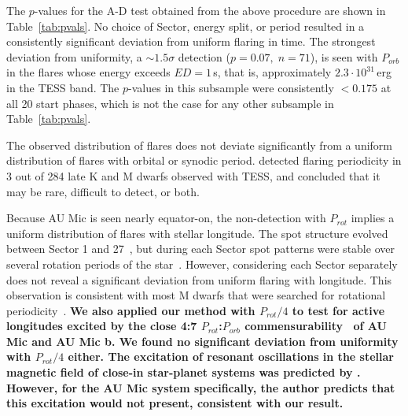 \documentclass[fleqn,usenatbib]{mnras}%
\begin{document}
The $p$-values for the A-D test obtained from the above procedure are shown in Table~\ref{tab:pvals}. No choice of Sector, energy split, or period resulted in a consistently significant deviation from uniform flaring in time. The strongest deviation from uniformity, a $\sim1.5\sigma$ detection ($p=0.07,\;n=71$), is seen with $P_{orb}$ in the flares whose energy exceeds $ED=1$\,s, that is, approximately $2.3\cdot10^{31}\,$erg in the TESS band. The $p$-values in this subsample were consistently $<0.175$ at all 20 start phases, which is not the case for any other subsample in Table~\ref{tab:pvals}.

The observed distribution of flares does not deviate significantly from a uniform distribution of flares with orbital or synodic period. \citet{howard2021evryflare} detected flaring periodicity in 3 out of 284 late K and M dwarfs observed with TESS, and concluded that it may be rare, difficult to detect, or both.

Because AU Mic is seen nearly equator-on, the non-detection with $P_{rot}$ implies a uniform distribution of flares with stellar longitude. The spot structure evolved between Sector 1 and 27~\citep{martioli2021new}, but during each Sector spot patterns were stable over several rotation periods of the star~\citep{szabo2021changing}. However, considering each Sector separately does not reveal a significant deviation from uniform flaring with longitude. This observation is consistent with most M dwarfs that were searched for rotational periodicity~\citep{doyle2018, doyle2019}. \textbf{We also applied our method with $P_{rot}/4$ to test for active longitudes excited by the close 4:7 $P_{rot}$:$P_{orb}$ commensurability~\citep{szabo2021changing,cale2021diving} of AU Mic and AU Mic b. We found no significant deviation from uniformity with $P_{rot}/4$ either. The excitation of resonant oscillations in the stellar magnetic field of close-in star-planet systems was predicted by \citet{lanza2022model}. However, for the AU Mic system specifically, the author predicts that this excitation would not present, consistent with our result.}
 

\end{document}
